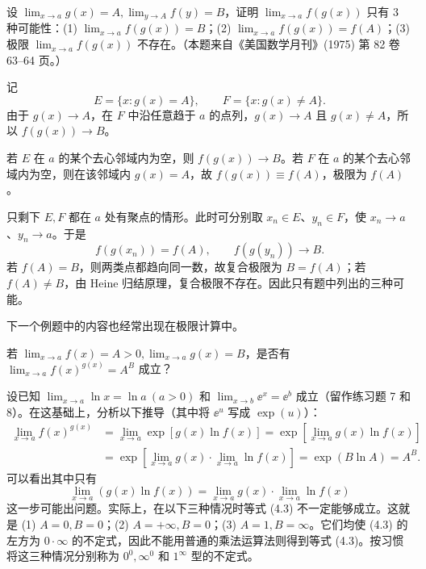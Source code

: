 \begin{xthought}
设 $\lim_{x\to a}g(x)=A,\lim_{y\to A}f(y)=B$，证明 $\lim_{x\to a}f(g(x))$ 只有 3 种可能性：(1) $\lim_{x\to a}f(g(x))=B$；(2) $\lim_{x\to a}f(g(x))=f(A)$；(3) 极限 $\lim_{x\to a}f(g(x))$ 不存在。（本题来自《美国数学月刊》(1975) 第 82 卷 63--64 页。）
\end{xthought}
\begin{xsolution}
记
\[
  E=\{x:g(x)=A\},\qquad F=\{x:g(x)\ne A\}.
\]
由于 $g(x)\to A$，在 $F$ 中沿任意趋于 $a$ 的点列，$g(x)\to A$ 且 $g(x)\ne A$，所以
$f(g(x))\to B$。

若 $E$ 在 $a$ 的某个去心邻域内为空，则 $f(g(x))\to B$。若 $F$ 在 $a$ 的某个去心邻域内为空，则在该邻域内 $g(x)=A$，故 $f(g(x))\equiv f(A)$，极限为 $f(A)$。

只剩下 $E,F$ 都在 $a$ 处有聚点的情形。此时可分别取 $x_n\in E$、$y_n\in F$，使 $x_n\to a$、$y_n\to a$。于是
\[
  f(g(x_n))=f(A),\qquad f(g(y_n))\to B.
\]
若 $f(A)=B$，则两类点都趋向同一数，故复合极限为 $B=f(A)$；若 $f(A)\ne B$，由 Heine 归结原理，复合极限不存在。因此只有题中列出的三种可能。
\end{xsolution}


下一个例题中的内容也经常出现在极限计算中。

\begin{xexample}[4.1.6]
若 $\lim_{x\to a}f(x)=A>0,\lim_{x\to a}g(x)=B$，是否有 $\lim_{x\to a}f(x)^{g(x)}=A^B$ 成立？
\end{xexample}
\begin{xsolution}
设已知 $\lim_{x\to a}\ln x=\ln a\ (a>0)$ 和 $\lim_{x\to b}\ee^x=\ee^b$ 成立（留作练习题 7 和 8）。在这基础上，分析以下推导（其中将 $\ee^u$ 写成 $\exp(u)$）：
\begin{align*}
  \lim_{x\to a}f(x)^{g(x)}
  &=\lim_{x\to a}\exp[g(x)\ln f(x)]
   =\exp[\lim_{x\to a}g(x)\ln f(x)]\\
  &=\exp[\lim_{x\to a}g(x)\cdot\lim_{x\to a}\ln f(x)]
   =\exp(B\ln A)=A^B.
\end{align*}
可以看出其中只有
\begin{equation}
  \lim_{x\to a}(g(x)\ln f(x))=\lim_{x\to a}g(x)\cdot\lim_{x\to a}\ln f(x)
  \tag{4.3}
  \label{eq:4.3}
\end{equation}
这一步可能出问题。实际上，在以下三种情况时等式 (4.3) 不一定能够成立。这就是 (1) $A=0,B=0$；(2) $A=+\infty,B=0$；(3) $A=1,B=\infty$。它们均使 (4.3) 的左方为 $0\cdot\infty$ 的不定式，因此不能用普通的乘法运算法则得到等式 (4.3)。按习惯将这三种情况分别称为 $0^0,\infty^0$ 和 $1^\infty$ 型的不定式。
\end{xsolution}

